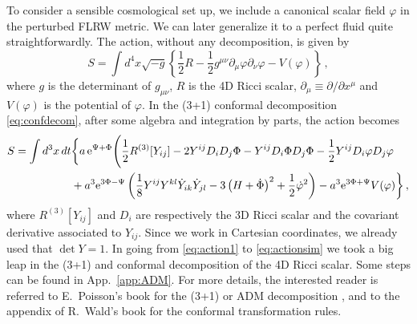 \documentclass[a4paper,11pt]{article}
\numberwithin{equation}{section}
\begin{document}
To consider a sensible cosmological set up, we include a canonical scalar field $\varphi$ in the perturbed FLRW metric. We can later generalize it to a perfect fluid quite straightforwardly. The action, without any decomposition, is given by
\begin{equation}\label{eq:action1}
      S= \int d^4x \sqrt{-g} \left\{\frac{1}{2}R-\frac{1}{2}g^{\mu\nu}\partial_\mu\varphi\partial_\nu\varphi-V(\varphi)\right\}\,,
\end{equation}
where $g$ is the determinant of $g_{\mu\nu}$, $R$ is the 4D Ricci scalar, $\partial_\mu\equiv\partial/\partial x^\mu$ and $V(\varphi)$ is the potential of $\varphi$.
In the (3+1) conformal decomposition \eqref{eq:confdecom}, after some algebra and integration by parts, the action becomes
\begin{equation}\label{eq:actionsim}
      \begin{split}
         S=\int d^3x \,dt &\bigg\{ a\,{\rm e}^{\Psi+\Phi}\Bigg(\frac{1}{2}R^{(3)}[Y_{ij}]-2Y^{ij}D_iD_j\Phi-Y^{ij} D_i \Phi D_j \Phi-\frac{1}{2}Y^{ij} D_i \varphi D_j \varphi\\&
         +a^3{\rm e}^{3\Phi-\Psi}\left(\frac{1}{8}Y^{ij}Y^{kl}\dot Y_{ik}\dot Y_{jl}-{3}\left(H+\dot\Phi\right)^2+\frac{1}{2}\dot\varphi^2\right)-a^3{\rm e}^{3\Phi+\Psi}V(\varphi)\bigg\}\,,
      \end{split}
\end{equation}
where $R^{(3)}[Y_{ij}]$ and $D_i$ are respectively the 3D Ricci scalar and the covariant derivative associated to $Y_{ij}$. Since we work in Cartesian coordinates, we already used that $\det Y=1$. In going from \eqref{eq:action1} to \eqref{eq:actionsim} we took a big leap in the (3+1) and conformal decomposition of the 4D Ricci scalar. Some steps can be found in App.~\ref{app:ADM}. For more details, the interested reader is referred to E.~Poisson's book \cite{Poisson:2009pwt} for the (3+1) or ADM decomposition \cite{Arnowitt:1962hi}, and to the appendix of R.~Wald's book \cite{Wald:1984rg} for the conformal transformation rules.
\end{document}
